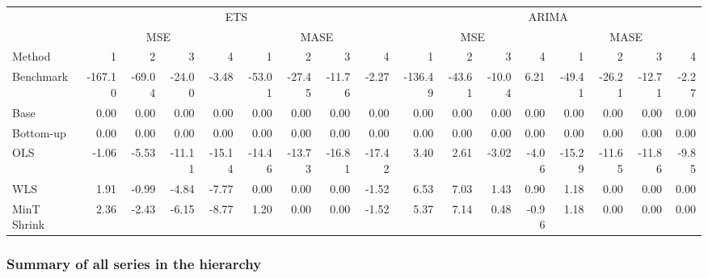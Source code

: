 \documentclass[]{article}
\begin{document}
\begin{table}[H]
\centering
\begin{tabular}{l|r|r|r|r|r|r|r|r|r|r|r|r|r|r|r|r}
\hline
\multicolumn{1}{c|}{ } & \multicolumn{8}{|c|}{ETS} & \multicolumn{8}{|c}{ARIMA} \\
\cline{2-9} \cline{10-17}
\multicolumn{1}{c|}{ } & \multicolumn{4}{|c|}{MSE} & \multicolumn{4}{|c|}{MASE} & \multicolumn{4}{|c|}{MSE} & \multicolumn{4}{|c}{MASE} \\
\cline{2-5} \cline{6-9} \cline{10-13} \cline{14-17}
Method & 1 & 2 & 3 & 4 & 1 & 2 & 3 & 4 & 1 & 2 & 3 & 4 & 1 & 2 & 3 & 4\\
\hline
Benchmark & -167.10 & -69.04 & -24.00 & -3.48 & -53.01 & -27.45 & -11.76 & -2.27 & -136.49 & -43.61 & -10.04 & 6.21 & -49.41 & -26.21 & -12.71 & -2.27\\
\hline
Base & 0.00 & 0.00 & 0.00 & 0.00 & 0.00 & 0.00 & 0.00 & 0.00 & 0.00 & 0.00 & 0.00 & 0.00 & 0.00 & 0.00 & 0.00 & 0.00\\
\hline
Bottom-up & 0.00 & 0.00 & 0.00 & 0.00 & 0.00 & 0.00 & 0.00 & 0.00 & 0.00 & 0.00 & 0.00 & 0.00 & 0.00 & 0.00 & 0.00 & 0.00\\
\hline
OLS & -1.06 & -5.53 & -11.11 & -15.14 & -14.46 & -13.73 & -16.81 & -17.42 & 3.40 & 2.61 & -3.02 & -4.06 & -15.29 & -11.65 & -11.86 & -9.85\\
\hline
WLS & 1.91 & -0.99 & -4.84 & -7.77 & 0.00 & 0.00 & 0.00 & -1.52 & 6.53 & 7.03 & 1.43 & 0.90 & 1.18 & 0.00 & 0.00 & 0.00\\
\hline
MinT Shrink & 2.36 & -2.43 & -6.15 & -8.77 & 1.20 & 0.00 & 0.00 & -1.52 & 5.37 & 7.14 & 0.48 & -0.96 & 1.18 & 0.00 & 0.00 & 0.00\\
\hline
\end{tabular}
\end{table}

\subsubsection{Summary of all series in the
hierarchy}\label{summary-of-all-series-in-the-hierarchy}
\end{document}
